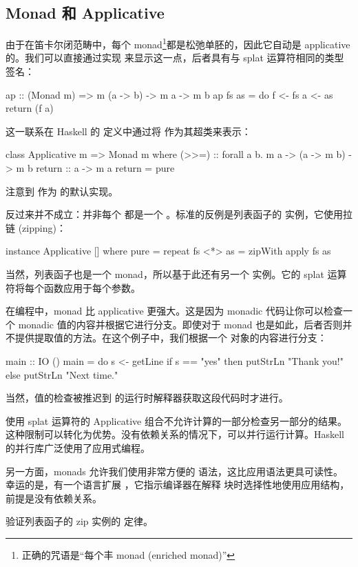 \documentclass[DaoFP]{subfiles}
\begin{document}
\subsection{Monad 和 Applicative}

由于在笛卡尔闭范畴中，每个 monad\footnote{正确的咒语是“每个丰 monad (enriched monad)”}都是松弛单胚的，因此它自动是 applicative 的。我们可以直接通过实现  来显示这一点，后者具有与 splat 运算符相同的类型签名：
\begin{haskell}
ap :: (Monad m) => m (a -> b) -> m a -> m b
ap fs as = do
f <- fs
a <- as
return (f a)
\end{haskell}

这一联系在 Haskell 的  定义中通过将  作为其超类来表示：
\begin{haskell}
class Applicative m => Monad m where
(>>=)       :: forall a b. m a -> (a -> m b) -> m b
return      :: a -> m a
return      = pure
\end{haskell}
注意到  作为  的默认实现。

反过来并不成立：并非每个  都是一个 。标准的反例是列表函子的  实例，它使用拉链 (zipping)：
\begin{haskell}
instance Applicative [] where
pure = repeat
fs <*> as = zipWith apply fs as
\end{haskell}
当然，列表函子也是一个 monad，所以基于此还有另一个  实例。它的 splat 运算符将每个函数应用于每个参数。

在编程中，monad 比 applicative 更强大。这是因为 monadic 代码让你可以检查一个 monadic 值的内容并根据它进行分支。即使对于  monad 也是如此，后者否则并不提供提取值的方法。在这个例子中，我们根据一个  对象的内容进行分支：
\begin{haskell}
main :: IO ()
main = do
s <- getLine
if s == "yes"
then putStrLn "Thank you!"
else putStrLn "Next time."
\end{haskell}
当然，值的检查被推迟到  的运行时解释器获取这段代码时才进行。

使用 splat 运算符的 Applicative 组合不允许计算的一部分检查另一部分的结果。这种限制可以转化为优势。没有依赖关系的情况下，可以并行运行计算。Haskell 的并行库广泛使用了应用式编程。

另一方面，monads 允许我们使用非常方便的  语法，这比应用语法更具可读性。幸运的是，有一个语言扩展 ，它指示编译器在解释  块时选择性地使用应用结构，前提是没有依赖关系。

\begin{exercise}
验证列表函子的 zip 实例的  定律。
\end{exercise}
\end{document}
